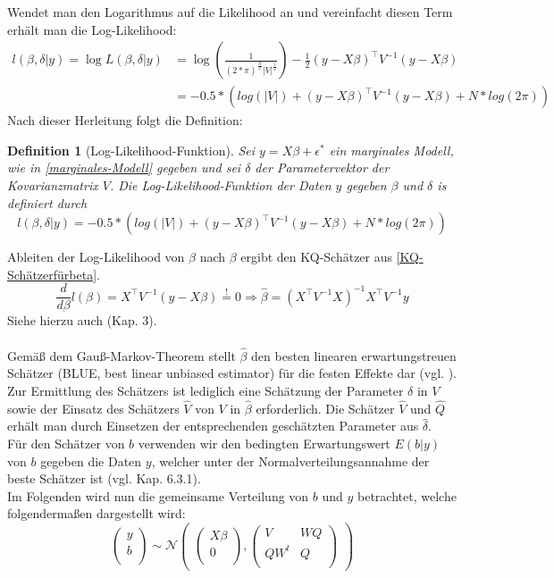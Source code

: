 \documentclass[%
thesis=student,%
coverpage=false,%
titlepage=false,%
headmarks=true, %
german,%
font=libertine, %
math=newpxtx, %
BCOR=5mm,%
coverBCOR=11mm%
]{tumbook}
\theoremstyle{break}
\newtheorem{definition}{Definition}[section]
\begin{document}
Wendet man den Logarithmus auf die Likelihood an und vereinfacht diesen Term erhält man die Log-Likelihood: 
\begin{align}
	l(\beta,\delta|y) = \log L(\beta,\delta|y) &= \log(\frac{1}{(2*\pi)^{\frac{N}{2}} |V|^{\frac{1}{2}}}) - \frac{1}{2} (y-X\beta)^{\top} V^{-1}(y-X\beta) \\
	&= -0.5 *(log(|V|)+ (y-X\beta)^{\top} V^{-1}(y-X\beta) + N * log(2\pi))
\end{align}
Nach dieser Herleitung folgt die Definition:
\begin{definition}[Log-Likelihood-Funktion]
	Sei $y = X\beta + \epsilon^*$ ein marginales Modell, wie in  \ref{marginales-Modell} gegeben und sei $\delta$ der Parametervektor der Kovarianzmatrix $V$.
	Die Log-Likelihood-Funktion der Daten $y$ gegeben $\beta$ und $\delta$ is definiert durch
	$$ l(\beta,\delta|y) = -0.5 *(log(|V|)+ (y-X\beta)^{\top} V^{-1}(y-X\beta) + N * log(2\pi))$$
\end{definition}\noindent
Ableiten der Log-Likelihood von $\beta$ nach $\beta$ ergibt den KQ-Schätzer aus \ref{KQ-Schätzerfürbeta}.
$$\frac{d}{d\beta}l(\beta) = X^{\top} V^{-1} (y-X\beta) \stackrel{!}{=} 0  \Rightarrow \hat{\beta} = (X^{\top} V^{-1}X)^{-1}X^{\top} V^{-1}y$$
Siehe hierzu auch \cite{fahrmeir-2011-regression} (Kap. 3).\\
\\
Gemäß dem Gauß-Markov-Theorem stellt $\hat{\beta}$ den besten linearen erwartungstreuen Schätzer (BLUE, best linear unbiased estimator) für die festen Effekte dar (vgl. \cite{Statistik-Wiwi}). Zur Ermittlung des Schätzers ist lediglich eine Schätzung der Parameter $\delta$ in $V$ sowie der Einsatz des Schätzers $\hat{V}$ von $V$ in $\hat{\beta}$ erforderlich. Die Schätzer $\hat{V}$ und $\hat{Q}$ erhält man durch Einsetzen der entsprechenden geschätzten Parameter aus $\hat{\delta}$. \\
Für den Schätzer von $b$ verwenden wir den bedingten Erwartungswert $E(b|y)$ von $b$ gegeben die Daten $y$, welcher unter der Normalverteilungsannahme der beste Schätzer ist (vgl. \cite{fahrmeir-2011-regression} Kap. 6.3.1). \\
Im Folgenden wird nun die gemeinsame Verteilung von $b$ und $y$ betrachtet, welche folgendermaßen dargestellt wird:
$$\begin{pmatrix}
	y \\
	b \\
\end{pmatrix}
\sim
\mathcal{N}
\begin{pmatrix}
	\begin{pmatrix}
		X\beta \\
		0 \\
	\end{pmatrix},
	\begin{pmatrix}
		V & W Q \\
		Q W^t & Q \\
	\end{pmatrix}
\end{pmatrix}$$
\end{document}
